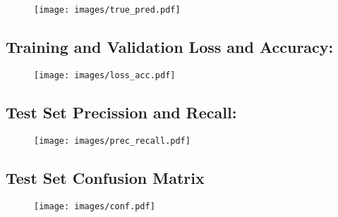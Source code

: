 \documentclass{article}%
\begin{document}
\begin{figure}[h!]%
\centering%
\texttt{[image: images/true\_pred.pdf]}%
\end{figure}

%
\subsection*{Training and Validation Loss and Accuracy:}%
\label{subsec:TrainingandValidationLossandAccuracy}%


\begin{figure}[h!]%
\centering%
\texttt{[image: images/loss\_acc.pdf]}%
\end{figure}

%
\subsection*{Test Set Precission and Recall:}%
\label{subsec:TestSetPrecissionandRecall}%


\begin{figure}[h!]%
\centering%
\texttt{[image: images/prec\_recall.pdf]}%
\end{figure}

%
\subsection*{Test Set Confusion Matrix}%
\label{subsec:TestSetConfusionMatrix}%


\begin{figure}[h!]%
\centering%
\texttt{[image: images/conf.pdf]}%
\end{figure}

%
\end{document}
